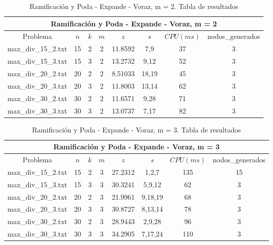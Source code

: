    \begin{table}[h]
   {\small
   \begin{center}
   \begin{tabular}{cccccccc}
      \multicolumn{8}{c}{Ramificación y Poda - Expande - Voraz, m = 2} \\
      \hline
      Problema & $n$ & $k$ & $m$ & $z$ & $s$ & $CPU(ms)$ & nodos\_generados \\
      \hline
      max\_div\_15\_2.txt & 15 & 2 & 2 & 11.8592 & 7,9 & 37 & 3 \\
      max\_div\_15\_3.txt & 15 & 3 & 2 & 13.2732 & 9,12 & 52 & 3 \\
      max\_div\_20\_2.txt & 20 & 2 & 2 & 8.51033 & 18,19 & 45 & 3 \\
      max\_div\_20\_3.txt & 20 & 3 & 2 & 11.8003 & 13,14 & 62 & 3 \\
      max\_div\_30\_2.txt & 30 & 2 & 2 & 11.6571 & 9,28 & 71 & 3 \\
      max\_div\_30\_3.txt & 30 & 3 & 2 & 13.0737 & 7,17 & 82 & 3 \\
      \hline
   \end{tabular}
   \end{center}
   }
   \caption{Ramificación y Poda - Expande - Voraz, m = 2. Tabla de resultados}
   \end{table}

   \begin{table}[h]
   {\small
   \begin{center}
   \begin{tabular}{cccccccc}
      \multicolumn{8}{c}{Ramificación y Poda - Expande - Voraz, m = 3} \\
      \hline
      Problema & $n$ & $k$ & $m$ & $z$ & $s$ & $CPU(ms)$ & nodos\_generados \\
      \hline
      max\_div\_15\_2.txt & 15 & 2 & 3 & 27.2312 & 1,2,7 & 135 & 15 \\
      max\_div\_15\_3.txt & 15 & 3 & 3 & 30.3241 & 5,9,12 & 62 & 3 \\
      max\_div\_20\_2.txt & 20 & 2 & 3 & 21.9961 & 9,18,19 & 68 & 3 \\
      max\_div\_20\_3.txt & 20 & 3 & 3 & 30.8727 & 8,13,14 & 78 & 3 \\
      max\_div\_30\_2.txt & 30 & 2 & 3 & 28.9443 & 2,9,28 & 96 & 3 \\
      max\_div\_30\_3.txt & 30 & 3 & 3 & 34.2905 & 7,17,24 & 110 & 3 \\
      \hline
   \end{tabular}
   \end{center}
   }
   \caption{Ramificación y Poda - Expande - Voraz, m = 3. Tabla de resultados}
   \end{table}

